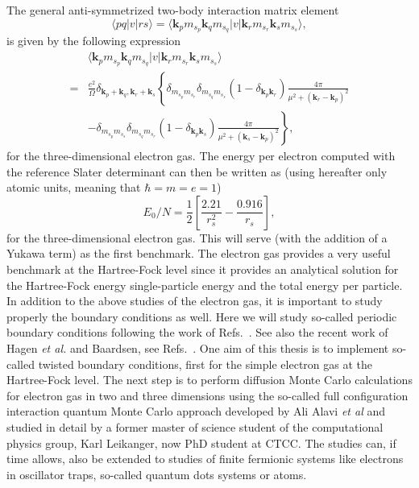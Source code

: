 \documentclass[aps,prc,twocolumn,showpacs,floatfix,nofootinbib,preprintnumbers,superscriptaddress,amsmath,amssymb]{revtex4-1}
\begin{document}
The general anti-symmetrized two-body interaction matrix element 
\[
\langle pq |v| r s \rangle = \langle
\mathbf{k}_{p}m_{s_{p}}\mathbf{k}_{q}m_{s_{q}}|v|\mathbf{k}_{r}m_{s_{r}}\mathbf{k}_{s}m_{s_{s}}\rangle,
\]
is given by the following expression
  \begin{align}
    & \langle
    \mathbf{k}_{p}m_{s_{p}}\mathbf{k}_{q}m_{s_{q}}|v|\mathbf{k}_{r}m_{s_{r}}\mathbf{k}_{s}m_{s_{s}}\rangle
    \nonumber \\ =&
    \frac{e^{2}}{\Omega}\delta_{\mathbf{k}_{p}+\mathbf{k}_{q},
      \mathbf{k}_{r}+\mathbf{k}_{s}}\left\{
    \delta_{m_{s_{p}}m_{s_{r}}}\delta_{m_{s_{q}}m_{s_{s}}}(1-\delta_{\mathbf{k}_{p}\mathbf{k}_{r}})\frac{4\pi
    }{\mu^{2} + (\mathbf{k}_{r}-\mathbf{k}_{p})^{2}} \right. \nonumber
    \\ & \left. -
    \delta_{m_{s_{p}}m_{s_{s}}}\delta_{m_{s_{q}}m_{s_{r}}}(1-\delta_{\mathbf{k}_{p}\mathbf{k}_{s}})\frac{4\pi
    }{\mu^{2} + (\mathbf{k}_{s}-\mathbf{k}_{p})^{2}} \right\},
    \nonumber
  \end{align}
for the three-dimensional electron gas.  The energy per electron computed with
the reference Slater determinant can then be written as 
(using hereafter only atomic units, meaning that $\hbar = m = e = 1$)
\[
E_0/N=\frac{1}{2}\left[\frac{2.21}{r_s^2}-\frac{0.916}{r_s}\right],
\]
for the three-dimensional electron gas.  This will serve (with the
addition of a Yukawa term) as the first benchmark. 
The electron gas provides a very useful benchmark at the Hartree-Fock level since it provides
an analytical solution for the Hartree-Fock energy single-particle energy and the total  energy per particle. 
In addition to the above studies of the electron gas, it
is important to study properly the boundary conditions as well. Here
we will study so-called periodic boundary conditions following the
work of Refs.~\cite{gros1992,gros1996,lin2001}. See also the recent
work of Hagen {\em et al.} and Baardsen, see Refs.~\cite{hagen2014,baardsen2014}. 
One aim 
of this thesis is to implement so-called twisted boundary conditions,
first for the simple electron gas at the Hartree-Fock level. 
The next
step is to perform diffusion Monte Carlo calculations 
for electron gas in two and three dimensions  using the so-called full configuration interaction quantum Monte Carlo approach developed by Ali Alavi {\em et al} and studied in detail by a former master of science student of the computational physics group, Karl Leikanger, now PhD student at CTCC.
The studies can, if time allows, also be extended to studies of finite fermionic systems like electrons in oscillator traps, so-called quantum dots systems or atoms. 
\end{document}
